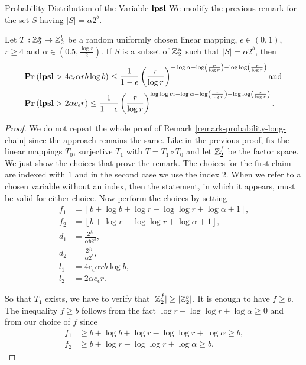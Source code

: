 \begin{section}{Probability Distribution of the Variable \texorpdfstring{$\mathbf{lpsl}$}{lpsl}}
We modify the previous remark for the set $S$ having $|S| = \alpha 2 ^ b$.
\begin{remark}
\label{remark-lpsl-pdf-linear-amount}
Let $T: \mathbb{Z}_{2}^{u} \rightarrow \mathbb{Z}_{2}^{b}$ be a random uniformly chosen linear mapping, $\epsilon \in (0, 1)$, $r \geq 4$ and $\alpha \in (0.5, \frac{\log r}{2})$. If $S$ is a subset of $\mathbb{Z}_{2}^{u}$ such that $|S| = \alpha 2 ^ b$, then
\[
\begin{split}
& \mathbf{Pr}\left(\mathbf{lpsl} > 4 c_\epsilon \alpha r b \log b\right) \leq \frac{1}{1 - \epsilon} \left(\frac{r}{\log r}\right)^{-\log \alpha - \log \left(\frac{r}{\log r}\right) - \log \log \left(\frac{r}{\log r}\right)} \text{and} \\
& \mathbf{Pr}\left(\mathbf{lpsl} > 2 \alpha c_\epsilon r\right) \leq \frac{1}{1 - \epsilon}\left(\frac{r}{\log r}\right)^{\log \log m - \log \alpha - \log \left(\frac{r}{\log r}\right) - \log \log \left(\frac{r}{\log r}\right)} \text{.}
\end{split}
\]
\end{remark}
\begin{proof}
We do not repeat the whole proof of Remark \ref{remark-probability-long-chain} since the approach remains the same. Like in the previous proof, fix the linear mappings $T_0$, surjective $T_1$ with $T = T_1 \circ T_0$ and let $\mathbb{Z}_{2}^{f}$ be the factor space. We just show the choices that prove the remark. The choices for the first claim are indexed with $1$ and in the second case we use the index $2$. When we refer to a chosen variable without an index, then the statement, in which it appears, must be valid for either choice.
Now perform the choices by setting
\[
\begin{split}
	f_1 & = \left\lfloor b + \log b + \log r - \log \log r + \log \alpha + 1 \right\rfloor \text{,} \\
	f_2 & = \left\lfloor b + \log r - \log \log r + \log \alpha + 1 \right\rfloor \text{,} \\
	d_1 & = \frac{2 ^ {f_1}}{\alpha b 2 ^ b} \text{,} \\
	d_2 & = \frac{2 ^ {f_2}}{\alpha 2 ^ b} \text{,} \\
	l_1 & = 4 c_\epsilon \alpha r b \log b \text{,} \\
	l_2 & = 2 \alpha c_\epsilon r \text{.}
\end{split}
\]

So that $T_1$ exists, we have to verify that $|\mathbb{Z}_{2}^{f}| \geq |\mathbb{Z}_{2}^{b}|$. It is enough to have $f \geq b$. The inequality $f \geq b$ follows from the fact $\log r - \log \log r + \log \alpha \geq 0$ and from our choice of $f$ since
\[
\begin{split}
	f_1 & \geq b + \log b + \log r - \log \log r + \log \alpha \geq b \text{,} \\
	f_2 & \geq b + \log r - \log \log r + \log \alpha \geq b \text{.}
\end{split}
\]


\end{proof}
\end{section}
